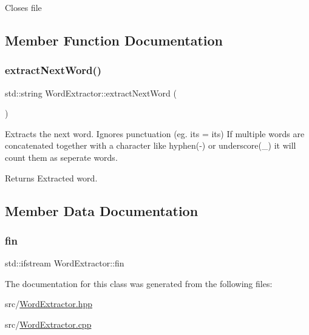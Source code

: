 Closes file 

\subsection{Member Function Documentation}
\mbox{\label{class_word_extractor_aae86b87d65bcfe432ec50c88fec4f464}} 
\subsubsection{\texorpdfstring{extract\+Next\+Word()}{extractNextWord()}}
{\footnotesize\ttfamily std\+::string Word\+Extractor\+::extract\+Next\+Word (\begin{DoxyParamCaption}{ }\end{DoxyParamCaption})}



Extracts the next word. Ignores punctuation (eg. it\textquotesingle{}s = its) If multiple words are concatenated together with a character like hyphen(-\/) or underscore(\+\_\+) it will count them as seperate words. 

\begin{DoxyReturn}{Returns}
Extracted word. 
\end{DoxyReturn}


\subsection{Member Data Documentation}
\mbox{\label{class_word_extractor_a819fb5e08b5349e0c5f4e97a2393bbb2}} 
\subsubsection{\texorpdfstring{fin}{fin}}
{\footnotesize\ttfamily std\+::ifstream Word\+Extractor\+::fin\hspace{0.3cm}{\ttfamily [private]}}



The documentation for this class was generated from the following files\+:\begin{DoxyCompactItemize}
\item 
src/\mbox{\hyperlink{_word_extractor_8hpp}{Word\+Extractor.\+hpp}}\item 
src/\mbox{\hyperlink{_word_extractor_8cpp}{Word\+Extractor.\+cpp}}\end{DoxyCompactItemize}
